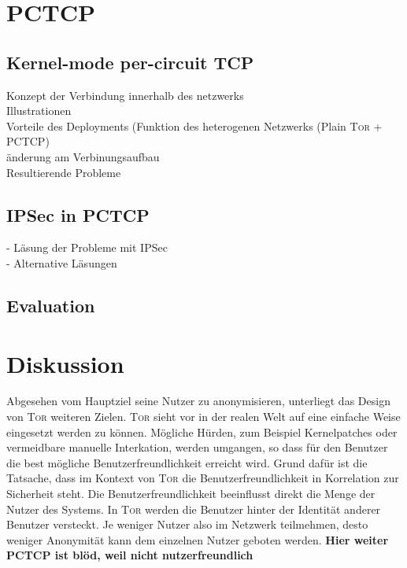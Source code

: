 \documentclass[fleqn,envcountsame,runningheads,10pt,a4paper]{llncs}
\begin{document}
\section{PCTCP}
\label{sec:pctcp}



\subsection{Kernel-mode per-circuit TCP}
\label{sec:kernelmode}

Konzept der Verbindung innerhalb des netzwerks\\
Illustrationen\\
Vorteile des Deployments (Funktion des heterogenen Netzwerks (Plain \textsc{Tor} + PCTCP)\\
änderung am Verbinungsaufbau\\
Resultierende Probleme\\

\subsection{IPSec in PCTCP}
\label{sec:ipsecinpctcp}

- Läsung der Probleme mit IPSec\\ 
- Alternative Läsungen

\subsection{Evaluation}
\label{sec:evaluation}


\section{Diskussion}
\label{sec:discussion}



Abgesehen vom Hauptziel seine Nutzer zu anonymisieren, unterliegt das Design von \textsc{Tor} weiteren Zielen. \textsc{Tor} sieht vor in der realen Welt auf eine einfache Weise eingesetzt werden zu können. Mögliche Hürden, zum Beispiel Kernelpatches oder vermeidbare manuelle Interkation, werden umgangen, so dass für den Benutzer die best mögliche Benutzerfreundlichkeit erreicht wird. Grund dafür ist die Tatsache, dass im Kontext von \textsc{Tor} die Benutzerfreundlichkeit in Korrelation zur Sicherheit steht. Die Benutzerfreundlichkeit beeinflusst direkt die Menge der Nutzer des Systems. In \textsc{Tor} werden die Benutzer hinter der Identität anderer Benutzer versteckt. Je weniger Nutzer also im Netzwerk teilmehmen, desto weniger Anonymität kann dem einzelnen Nutzer geboten werden. \textbf{Hier weiter PCTCP ist blöd, weil nicht nutzerfreundlich}\\
\end{document}
